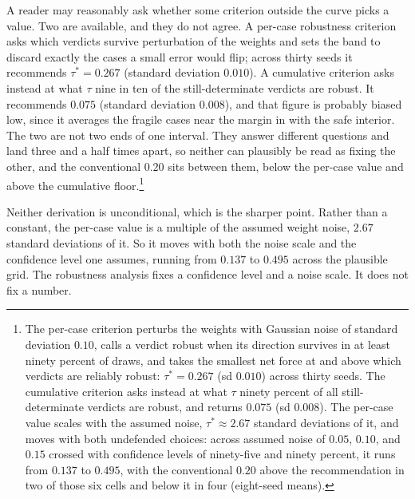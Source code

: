 A reader may reasonably ask whether some criterion outside the curve
picks a value. Two are available, and they do not agree. A per-case
robustness criterion asks which verdicts survive perturbation of the
weights and sets the band to discard exactly the cases a small error
would flip; across thirty seeds it recommends $\tau^{*} = 0.267$ (standard deviation
$0.010$). A cumulative criterion asks instead at what $\tau$ nine in ten of
the still-determinate verdicts are robust. It recommends $0.075$ (standard
deviation $0.008$), and that figure is probably biased low, since it averages the fragile cases near the margin in with
the safe interior. The two are not two ends of one interval. They answer different questions and land three and a half times apart, so
neither can plausibly be read as fixing the other, and the conventional
$0.20$ sits between them, below the per-case value and above
the cumulative floor.\footnote{The per-case criterion perturbs the
weights with Gaussian noise of standard deviation $0.10$, calls a verdict
robust when its direction survives in at least ninety percent of draws,
and takes the smallest net force at and above which verdicts are reliably
robust: $\tau^{*} = 0.267$ (sd $0.010$) across thirty seeds. The
cumulative criterion asks instead at what $\tau$ ninety percent of all
still-determinate verdicts are robust, and returns $0.075$ (sd $0.008$).
The per-case value scales with the assumed noise, $\tau^{*} \approx 2.67$
standard deviations of it, and moves with both undefended choices: across
assumed noise of $0.05$, $0.10$, and $0.15$ crossed with confidence
levels of ninety-five and ninety percent, it runs from $0.137$ to
$0.495$, with the conventional $0.20$ above the recommendation in two of
those six cells and below it in four (eight-seed means).}

Neither derivation is unconditional, which is the sharper point. Rather than a constant, the per-case value is a multiple of the assumed
weight noise, $2.67$ standard deviations of it. So it moves with both the
noise scale and the confidence level one assumes, running from $0.137$ to
$0.495$ across the plausible grid. The robustness analysis fixes a
confidence level and a noise scale. It does not fix a number.

